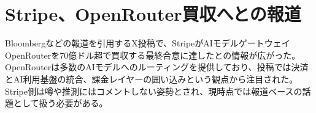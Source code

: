 \section{Stripe、OpenRouter買収へとの報道}
Bloombergなどの報道を引用するX投稿で、StripeがAIモデルゲートウェイOpenRouterを70億ドル超で買収する最終合意に達したとの情報が広がった。OpenRouterは多数のAIモデルへのルーティングを提供しており、投稿では決済とAI利用基盤の統合、課金レイヤーの囲い込みという観点から注目された。Stripe側は噂や推測にはコメントしない姿勢とされ、現時点では報道ベースの話題として扱う必要がある。
